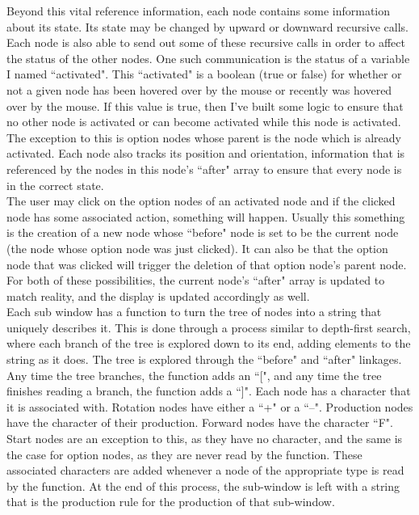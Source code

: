 \documentclass[12pt,twoside]{reedthesis}
\begin{document}
	Beyond this vital reference information, each node contains some information about its state. Its state may be changed by upward or downward recursive calls. Each node is also able to send out some of these recursive calls in order to affect the status of the other nodes. One such communication is the status of a variable I named ``activated". This ``activated" is a boolean (true or false) for whether or not a given node has been hovered over by the mouse or recently was hovered over by the mouse. If this value is true, then I've built some logic to ensure that no other node is activated or can become activated while this node is activated. The exception to this is option nodes whose parent is the node which is already activated. Each node also tracks its position and orientation, information that is referenced by the nodes in this node's ``after" array to ensure that every node is in the correct state.\\
	
	The user may click on the option nodes of an activated node and if the clicked node has some associated action, something will happen. Usually this something is the creation of a new node whose ``before" node is set to be the current node (the node whose option node was just clicked). It can also be that the option node that was clicked will trigger the deletion of that option node's parent node. For both of these possibilities, the current node's ``after" array is updated to match reality, and the display is updated accordingly as well.\\
	
	 Each sub window has a function to turn the tree of nodes into a string that uniquely describes it. This is done through a process similar to depth-first search, where each branch of the tree is explored down to its end, adding elements to the string as it does. The tree is explored through the ``before" and ``after" linkages. Any time the tree branches, the function adds an ``[", and any time the tree finishes reading a branch, the function adds a ``]". Each node has a character that it is associated with. Rotation nodes have either a ``+" or a ``–". Production nodes have the character of their production. Forward nodes have the character ``F". Start nodes are an exception to this, as they have no character, and the same is the case for option nodes, as they are never read by the function. These associated characters are added whenever a node of the appropriate type is read by the function. At the end of this process, the sub-window is left with a string that is the production rule for the production of that sub-window.\\
	
\end{document}

